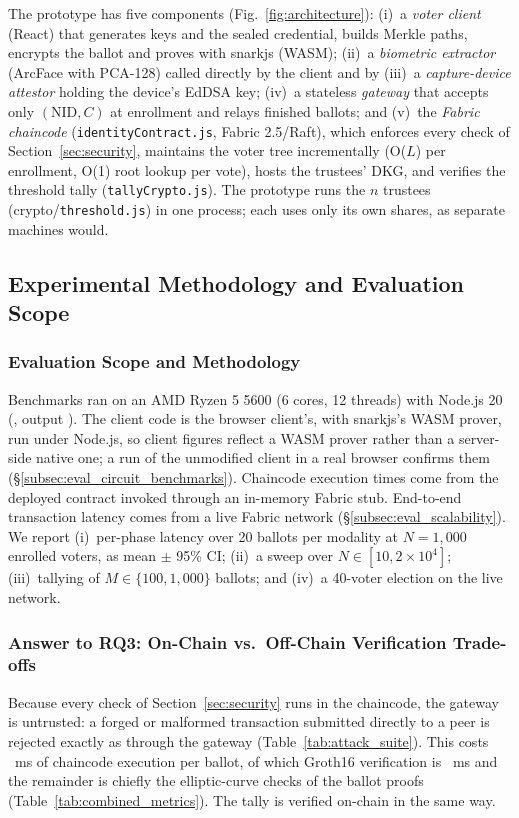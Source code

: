\documentclass[10pt,letterpaper,journal]{IEEEtran}
\begin{document}
The prototype has five components (Fig.~\ref{fig:architecture}): (i)~a \emph{voter client} (React) that generates keys and the sealed credential, builds Merkle paths, encrypts the ballot and proves with snarkjs (WASM); (ii)~a \emph{biometric extractor} (ArcFace with PCA-128) called directly by the client and by (iii)~a \emph{capture-device attestor} holding the device's EdDSA key; (iv)~a stateless \emph{gateway} that accepts only $(\text{NID}, C)$ at enrollment and relays finished ballots; and (v)~the \emph{Fabric chaincode} (\texttt{identityContract.js}, Fabric 2.5/Raft), which enforces every check of Section~\ref{sec:security}, maintains the voter tree incrementally (O($L$) per enrollment, O(1) root lookup per vote), hosts the trustees' DKG, and verifies the threshold tally (\texttt{tallyCrypto.js}). The prototype runs the $n$ trustees (crypto/\texttt{threshold.js}) in one process; each uses only its own shares, as separate machines would.

\subsection{Experimental Methodology and Evaluation Scope}

\subsubsection{Evaluation Scope and Methodology}
Benchmarks ran on an AMD Ryzen 5 5600 (6 cores, 12 threads) with Node.js 20 (, output ). The client code is the browser client's, with snarkjs's WASM prover, run under Node.js, so client figures reflect a WASM prover rather than a server-side native one; a run of the unmodified client in a real browser confirms them (\S\ref{subsec:eval_circuit_benchmarks}). Chaincode execution times come from the deployed contract invoked through an in-memory Fabric stub. End-to-end transaction latency comes from a live Fabric network (\S\ref{subsec:eval_scalability}). We report (i)~per-phase latency over 20 ballots per modality at $N = 1{,}000$ enrolled voters, as mean $\pm$ 95\% CI; (ii)~a sweep over $N \in [10, 2\times 10^4]$; (iii)~tallying of $M \in \{100, 1{,}000\}$ ballots; and (iv)~a 40-voter election on the live network.

\subsubsection{Answer to RQ3: On-Chain vs.\ Off-Chain Verification Trade-offs}
Because every check of Section~\ref{sec:security} runs in the chaincode, the gateway is untrusted: a forged or malformed transaction submitted directly to a peer is rejected exactly as through the gateway (Table~\ref{tab:attack_suite}). This costs \nCastVoteMs~ms of chaincode execution per ballot, of which Groth16 verification is \nVerifyMs~ms and the remainder is chiefly the elliptic-curve checks of the ballot proofs (Table~\ref{tab:combined_metrics}). The tally is verified on-chain in the same way.
\end{document}
